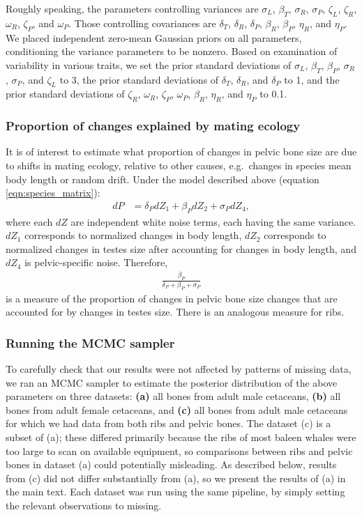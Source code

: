 \documentclass[12pt]{article}
\begin{document}
Roughly speaking, the parameters controlling variances are 
$\sigma_L$, $\beta_T$, $\sigma_R$, $\sigma_P$, $\zeta_L$, $\zeta_R$, $\omega_R$, $\zeta_P$, and $\omega_P$.
Those controlling covariances are $\delta_T$, $\delta_R$, $\delta_P$, $\beta_R$, $\beta_P$, $\eta_R$, and $\eta_P$.
We placed independent zero-mean Gaussian priors on all parameters, conditioning the variance parameters to be nonzero.
Based on examination of variability in various traits, we set
the prior standard deviations of $\sigma_L$, $\beta_T$, $\beta_P$, $\sigma_R$, $\sigma_P$, and $\zeta_L$ to 3,
the prior standard deviations of $\delta_T$, $\delta_R$, and $\delta_P$ to 1,
and the prior standard deviations of $\zeta_R$, $\omega_R$, $\zeta_P$, $\omega_P$, $\beta_R$, $\eta_R$, and $\eta_P$ to 0.1.


\subsubsection*{Proportion of changes explained by mating ecology}

It is of interest to estimate what proportion of changes in pelvic bone size are due to shifts in mating ecology,
relative to other causes, e.g.\ changes in species mean body length or random drift.
Under the model described above (equation \eqref{eqn:species_matrix}):
\begin{align}
   dP &= \delta_P dZ_1 + \beta_P dZ_2 + \sigma_P dZ_4 ,
 \end{align}
where each $dZ$ are independent white noise terms, each having the same variance.
$dZ_1$ corresponds to normalized changes in body length,
$dZ_2$ corresponds to normalized changes in testes size after accounting for changes in body length,
and $dZ_4$ is pelvic-specific noise.
Therefore, 
\begin{align}
  \frac{ \beta_P }{ \delta_P + \beta_P  + \sigma_P }
\end{align}
is a measure of the proportion of changes in pelvic bone size changes that are accounted for by changes in testes size.
There is an analogous measure for ribs.



\subsubsection*{Running the MCMC sampler}

To carefully check that our results were not affected by patterns of missing data,
we ran an MCMC sampler to estimate the posterior distribution of the above parameters
on three datasets:
\textbf{(a)} all bones from adult male cetaceans,
\textbf{(b)} all bones from adult female cetaceans,
and \textbf{(c)} all bones from adult male cetaceans for which we had data from both ribs and pelvic bones.
The dataset (c) is a subset of (a);
these differed primarily because the ribs of most baleen whales were too large to scan on available equipment,
so comparisons between ribs and pelvic bones in dataset (a) could potentially misleading.
As described below, results from (c) did not differ substantially from (a),
so we present the results of (a) in the main text.
Each dataset was run using the same pipeline, 
by simply setting the relevant observations to missing.
\end{document}
